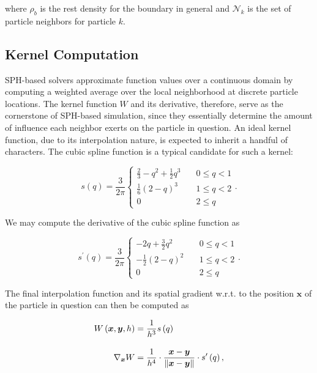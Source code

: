 \documentclass[
	11pt, 
	DIV10,
	ngerman,
	a4paper, 
	oneside, 
	headings=normal, 
	captions=tableheading,
	final, 
	numbers=noenddot
]{scrartcl}
\DeclarePairedDelimiter{\norm}{\lVert}{\rVert}
\begin{document}
where $ \rho_{b} $ is the rest density for the boundary in general and $ \mathcal{N}_{k} $ is the set of particle neighbors for particle $ k $.

\subsection{Kernel Computation}

SPH-based solvers approximate function values over a continuous domain by computing a weighted average over the local neighborhood at discrete particle locations. The kernel function $ W $ and its derivative, therefore, serve as the cornerstone of SPH-based simulation, since they essentially determine the amount of influence each neighbor exerts on the particle in question. An ideal kernel function, due to its interpolation nature, is expected to inherit a handful of characters. The cubic spline function is a typical candidate for such a kernel:

\begin{equation}
	\label{eq11}
	s\left(q\right) = \frac{3}{2\pi}\left\{
	\begin{array}{ll}
            \frac{2}{3} - q^{2} + \frac{1}{2}q^{3}	& \quad 0 \leq q < 1 \\[1em]
            \frac{1}{6}\left(2 - q\right)^{3}		& \quad 1 \leq q < 2 \\[1em]
            0	& \quad 2 \leq q
    \end{array}
    \right..
\end{equation}

We may compute the derivative of the cubic spline function as

\begin{equation}
	\label{eq12}
	s^{\prime}\left(q\right) = \frac{3}{2\pi}\left\{
	\begin{array}{ll}
            -2q + \frac{3}{2}q^{2}					& \quad 0 \leq q < 1 \\[1em]
            -\frac{1}{2}\left(2 - q\right)^{2}		& \quad 1 \leq q < 2 \\[1em]
            0	& \quad 2 \leq q
    \end{array}
    \right..
\end{equation}

The final interpolation function and its spatial gradient w.r.t. to the position $ \boldsymbol{x} $ of the particle in question can then be computed as

\begin{equation}
\begin{split}
	\label{eq13}
	W\left(\boldsymbol{x}, \boldsymbol{y}, h\right) &= \frac{1}{h^{3}}s\left(q\right) \\[1em]
	\nabla_{\boldsymbol{x}} W &= \frac{1}{h^{4}} \cdot \frac{\boldsymbol{x} - \boldsymbol{y}}{\norm{\boldsymbol{x} - \boldsymbol{y}}} \cdot s^{\prime}\left(q\right),
\end{split}
\end{equation}
\end{document}
